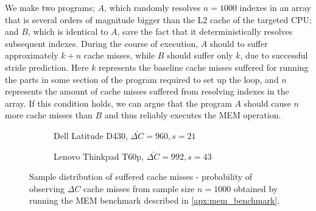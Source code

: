 We make two programs; \(A\), which randomly resolves \(n = 1000\) indexes in an array that is several orders of magnitude bigger than the L2 cache of the targeted CPU; and \(B\), which is identical to \(A\), save the fact that it deterministically resolves subsequent indexes.
During the course of execution, \(A\) should to suffer approximately \(k+n\) cache misses, while \(B\) should suffer only \(k\), due to successful stride prediction.
Here \(k\) represents the baseline cache misses suffered for running the parts in some section of the program required to set up the loop, and \(n\) represents the amount of cache misses suffered from resolving indexes in the array.
If this condition holds, we can argue that the program \(A\) should cause \(n\) more cache misses than \(B\) and thus reliably executes the MEM operation. 

\begin{figure}
    \begin{subfigure}{0.5\textwidth}
        \centering
        \caption{Dell Latitude D430, $\bar{\Delta C} = 960, s=21$ }
    \end{subfigure}
    \begin{subfigure}{0.5\textwidth}
        \centering
        \caption{Lenovo Thinkpad T60p, $\bar{\Delta C} = 992, s=43$ }
    \end{subfigure}
    \caption{Sample distribution of suffered cache misses - probability of observing \(\Delta C\) cache misses from sample size $n=1000$ obtained by running the MEM benchmark described in \autoref{apx:mem_benchmark}.}
    \label{fig:mem_benchmark}
\end{figure}

